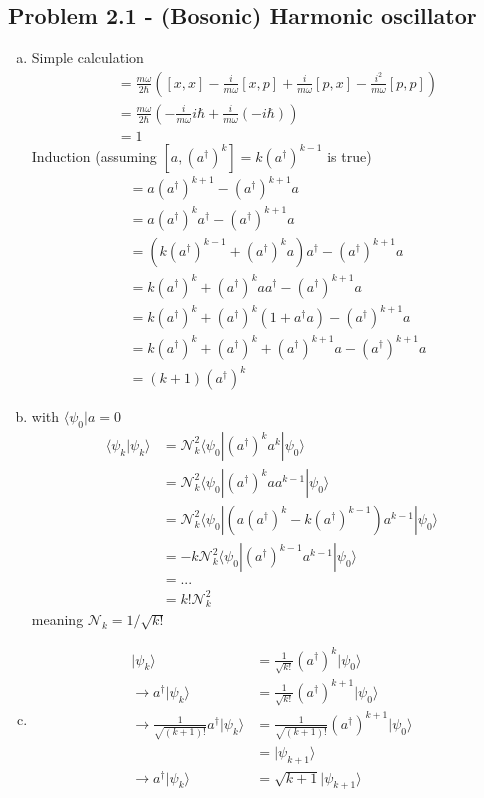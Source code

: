 \documentclass[../main.tex]{subfiles}
\begin{document}
\subsection{Problem 2.1 - (Bosonic) Harmonic oscillator}
\begin{enumerate}[(a)]
\item Simple calculation
\begin{align}
[a,a^\dagger]
&=\frac{m\omega}{2\hbar}\left(
[x,x]
-\frac{i}{m\omega}[x,p]
+\frac{i}{m\omega}[p,x]
-\frac{i^2}{m\omega}[p,p]
\right)\\
&=\frac{m\omega}{2\hbar}\left(
-\frac{i}{m\omega}i\hbar
+\frac{i}{m\omega}(-i\hbar)
\right)\\
&=1
\end{align}
Induction (assuming $[a,(a^\dagger)^{k}]=k(a^\dagger)^{k-1}$ is true)
\begin{align}
[a,(a^\dagger)^{k+1}]
&=a(a^\dagger)^{k+1}-(a^\dagger)^{k+1}a\\
&=a(a^\dagger)^{k}a^\dagger-(a^\dagger)^{k+1}a\\
&=(k(a^\dagger)^{k-1}+(a^\dagger)^{k}a)a^\dagger-(a^\dagger)^{k+1}a\\
&=k(a^\dagger)^{k}+(a^\dagger)^{k}aa^\dagger-(a^\dagger)^{k+1}a\\
&=k(a^\dagger)^{k}+(a^\dagger)^{k}(1+a^\dagger a)-(a^\dagger)^{k+1}a\\
&=k(a^\dagger)^{k}+(a^\dagger)^{k}+(a^\dagger)^{k+1}a-(a^\dagger)^{k+1}a\\
&=(k+1)(a^\dagger)^{k}
\end{align}

\item with $\langle\psi_0|a=0$
\begin{align}
\langle\psi_k|\psi_k\rangle
&=\mathcal{N}_k^2\langle\psi_0|(a^\dagger)^ka^k|\psi_0\rangle\\
&=\mathcal{N}_k^2\langle\psi_0|(a^\dagger)^kaa^{k-1}|\psi_0\rangle\\
&=\mathcal{N}_k^2\langle\psi_0|(a(a^\dagger)^k-k(a^\dagger)^{k-1})a^{k-1}|\psi_0\rangle\\
&=-k\mathcal{N}_k^2\langle\psi_0|(a^\dagger)^{k-1}a^{k-1}|\psi_0\rangle\\
&=...\\
&=k!\mathcal{N}_k^2
\end{align}
meaning $\mathcal{N}_k=1/\sqrt{k!}$ 
\item
\begin{align}
|\psi_k\rangle&=\frac{1}{\sqrt{k!}}(a^\dagger)^k|\psi_0\rangle\\
\rightarrow a^\dagger|\psi_k\rangle&=\frac{1}{\sqrt{k!}}(a^\dagger)^{k+1}|\psi_0\rangle\\
\rightarrow \frac{1}{\sqrt{(k+1)!}}a^\dagger|\psi_k\rangle&=\frac{1}{\sqrt{(k+1)!}}(a^\dagger)^{k+1}|\psi_0\rangle\\
&=|\psi_{k+1}\rangle\\
\rightarrow a^\dagger|\psi_k\rangle&=\sqrt{k+1}|\psi_{k+1}\rangle\\
\end{align}
\end{enumerate}
\end{document}
